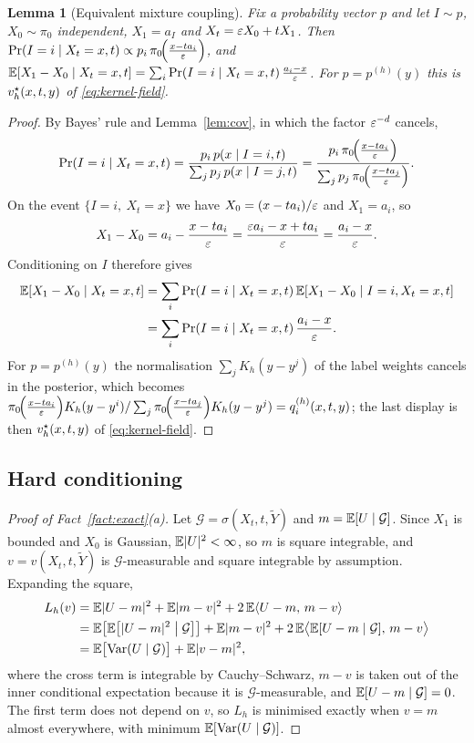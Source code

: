 \documentclass{article} %
\makeatletter
\newif\ificlr
\newcommand{\placeblock}[1]{\ificlr\@nameuse{moved@#1}\fi}
\theoremstyle{plain}
\newtheorem{lemma}[theorem]{Lemma}
\theoremstyle{definition}
\theoremstyle{remark}
\makeatother
\begin{document}
\begin{lemma}[Equivalent mixture coupling]
\label{lem:mixture-coupling}
Fix a probability vector $p$ and let $I\sim p$, $X_0\sim\pi_0$ independent, $X_1=a_I$ and
$X_t=\varepsilon X_0+tX_1$. Then $\Pr(I=i\mid X_t=x,t)\propto p_i\,\pi_0\!\Big(\frac{x-ta_{i}}{\varepsilon}\Big)$, and
$\mathbb{E}[X_1-X_0\mid X_t=x,t]=\sum_i\Pr(I=i\mid X_t=x,t)\,\frac{a_i-x}{\varepsilon}$. For
$p=p^{(h)}(y)$ this is $v_h^\star(x,t,y)$ of \eqref{eq:kernel-field}.
\end{lemma}
\begin{proof}
By Bayes' rule and Lemma~\ref{lem:cov}, in which the factor $\varepsilon^{-d}$ cancels,
\[
\Pr(I=i\mid X_t=x,t)=\frac{p_i\,p(x\mid I=i,t)}{\sum_jp_j\,p(x\mid I=j,t)}
=\frac{p_i\,\pi_0\!\Big(\frac{x-ta_{i}}{\varepsilon}\Big)}{\sum_jp_j\,\pi_0\!\Big(\frac{x-ta_{j}}{\varepsilon}\Big)} .
\]
On the event $\{I=i,\ X_t=x\}$ we have $X_0=(x-ta_i)/\varepsilon$ and $X_1=a_i$, so
\[
X_1-X_0=a_i-\frac{x-ta_i}{\varepsilon}=\frac{\varepsilon a_i-x+ta_i}{\varepsilon}=\frac{a_i-x}{\varepsilon}.
\]
Conditioning on $I$ therefore gives
\begin{align*}
\mathbb{E}[X_1-X_0\mid X_t=x,t]
&=\sum_i\Pr(I=i\mid X_t=x,t)\,\mathbb{E}[X_1-X_0\mid I=i,X_t=x,t]\\
&=\sum_i\Pr(I=i\mid X_t=x,t)\,\frac{a_i-x}{\varepsilon}.
\end{align*}
For $p=p^{(h)}(y)$ the normalisation $\sum_jK_h(y-y^j)$ of the label weights cancels in the
posterior, which becomes $\pi_0\!\Big(\frac{x-ta_{i}}{\varepsilon}\Big)K_h(y-y^{i})/\sum_j\pi_0\!\Big(\frac{x-ta_{j}}{\varepsilon}\Big)K_h(y-y^{j})=q^{(h)}_i(x,t,y)$; the last display is
then $v_h^\star(x,t,y)$ of \eqref{eq:kernel-field}.
\end{proof}

\subsection{Hard conditioning}
\label{apx:pf-hard}

\label{apx:pf-projection}
\factexact*
\begin{proof}[Proof of Fact~\ref{fact:exact}(a)]
Let $\mathcal G=\sigma(X_t,t,\widetilde Y)$ and $m=\mathbb{E}[U\mid\mathcal G]$. Since $X_1$ is bounded and
$X_0$ is Gaussian, $\mathbb{E}|U|^2<\infty$, so $m$ is square integrable, and $v=v(X_t,t,\widetilde Y)$ is
$\mathcal G$-measurable and square integrable by assumption. Expanding the square,
\begin{align*}
L_h(v)
&=\mathbb{E}|U-m|^2+\mathbb{E}|m-v|^2+2\,\mathbb{E}\langle U-m,\,m-v\rangle\\
&=\mathbb{E}\bigl[\mathbb{E}\bigl[|U-m|^2\bigm|\mathcal G\bigr]\bigr]+\mathbb{E}|m-v|^2
+2\,\mathbb{E}\bigl\langle\mathbb{E}[U-m\mid\mathcal G],\,m-v\bigr\rangle\\
&=\mathbb{E}\bigl[\operatorname{Var}(U\mid\mathcal G)\bigr]+\mathbb{E}|v-m|^2 ,
\end{align*}
where the cross term is integrable by Cauchy--Schwarz, $m-v$ is taken out of the inner conditional
expectation because it is $\mathcal G$-measurable, and $\mathbb{E}[U-m\mid\mathcal G]=0$. The first term
does not depend on $v$, so $L_h$ is minimised exactly when $v=m$ almost everywhere, with minimum
$\mathbb{E}[\operatorname{Var}(U\mid\mathcal G)]$.
\end{proof}
\placeblock{versionconvention}
\end{document}
